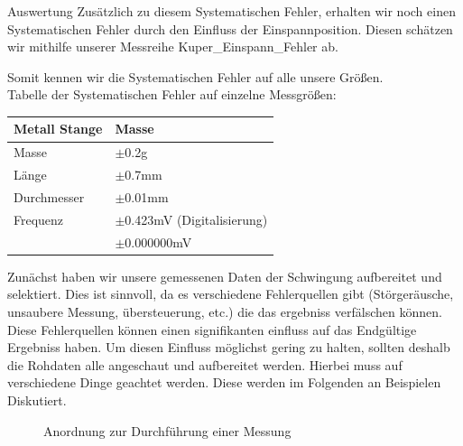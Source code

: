 \documentclass[twoside]{protokoll}
\begin{document}
\begin{aufgabe}{Auswertung}
Zusätzlich zu diesem Systematischen Fehler, erhalten wir noch einen Systematischen Fehler durch den Einfluss der Einspannposition. Diesen schätzen wir mithilfe unserer Messreihe Kuper\_Einspann\_Fehler ab.  

Somit kennen wir die Systematischen Fehler auf alle unsere Größen.\\


Tabelle der Systematischen Fehler auf einzelne Messgrößen: 

 \begin{table}[H]
        \centering
        \begin{tabularx}{0.8\textwidth}{X l} %
            \toprule
            \textbf{Metall Stange} & \textbf{Masse} \\
            \midrule
            Masse & $\pm$0.2g \\
            Länge & $\pm$0.7mm\\
            Durchmesser & $\pm$0.01mm \\
            Frequenz & $\pm$0.423mV (Digitalisierung)\\
            & $\pm$0.000000mV\\
            \bottomrule
        \end{tabularx}
        \label{tab:mytable}
    \end{table}
    
Zunächst haben wir unsere gemessenen Daten der Schwingung aufbereitet und selektiert. Dies ist sinnvoll, da es verschiedene Fehlerquellen gibt (Störgeräusche, unsaubere Messung, übersteuerung, etc.) die das ergebniss verfälschen können. Diese Fehlerquellen können einen signifikanten einfluss auf das Endgültige Ergebniss haben. Um diesen Einfluss möglichst gering zu halten, sollten deshalb die Rohdaten alle angeschaut und aufbereitet werden. Hierbei muss auf verschiedene Dinge geachtet werden. Diese werden im Folgenden an Beispielen Diskutiert. 


\begin{figure}[H]
  \centering
  \hfill
  \caption{Anordnung zur Durchführung einer Messung}
\end{figure}



\end{aufgabe}
\end{document}

